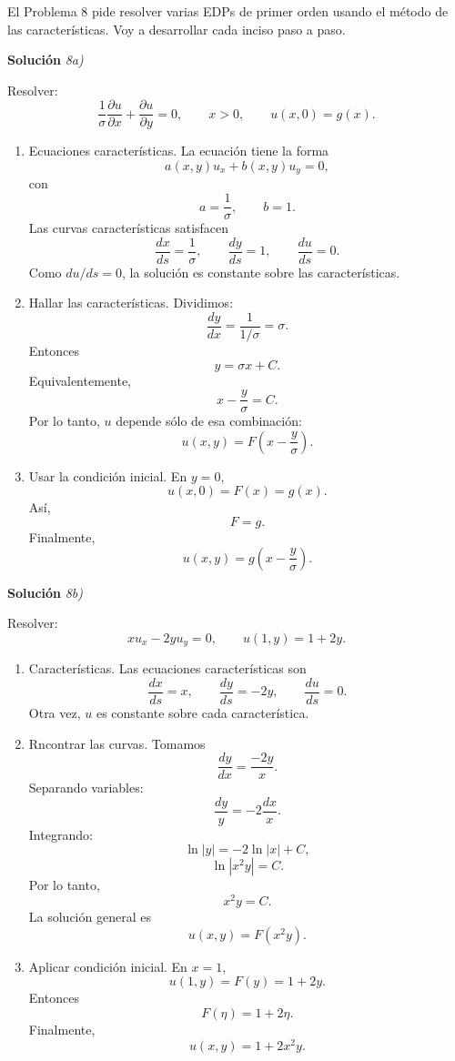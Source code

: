 \documentclass[11pt,spanish]{article}
\begin{document}
El Problema 8 pide resolver varias EDPs de primer orden usando el método de las características. 
Voy a desarrollar cada inciso paso a paso.

\vspace{0.5cm}
{\bf Soluci\'on }{\em 8a)}
\vspace{0.5cm}

Resolver:
$$
\frac1\sigma \frac{\partial u}{\partial x}+\frac{\partial u}{\partial y}=0,
\qquad x>0,
\qquad u(x,0)=g(x).
$$

\begin{enumerate}
\item Ecuaciones características.
La ecuación tiene la forma
$$
a(x,y)u_x+b(x,y)u_y=0,
$$
con
$$
a=\frac1\sigma,
\qquad
b=1.
$$
Las curvas características satisfacen
$$
\frac{dx}{ds}=\frac1\sigma,
\qquad
\frac{dy}{ds}=1,
\qquad
\frac{du}{ds}=0.
$$
Como $du/ds=0$, la solución es constante sobre las características.

\item Hallar las características.
Dividimos:
$$
\frac{dy}{dx}
=
\frac{1}{1/\sigma}
=
\sigma.
$$
Entonces
$$
y=\sigma x+C.
$$
Equivalentemente,
$$
x-\frac{y}{\sigma}=C.
$$
Por lo tanto, $u$ depende sólo de esa combinación:
$$
u(x,y)=F\left(x-\frac{y}{\sigma}\right).
$$

\item Usar la condición inicial.
En $y=0$,
$$
u(x,0)=F(x)=g(x).
$$
Así,
$$
F=g.
$$
Finalmente,
$$
\boxed{
u(x,y)=g\left(x-\frac{y}{\sigma}\right)
}.
$$
\end{enumerate}

\vspace{0.5cm}
{\bf Soluci\'on }{\em 8b)}
\vspace{0.5cm}

Resolver:
$$
x u_x-2y u_y=0,
\qquad
u(1,y)=1+2y.
$$

\begin{enumerate}
\item Características.
Las ecuaciones características son
$$
\frac{dx}{ds}=x,
\qquad
\frac{dy}{ds}=-2y,
\qquad
\frac{du}{ds}=0.
$$
Otra vez, $u$ es constante sobre cada característica.

\item Rncontrar las curvas.
Tomamos
$$
\frac{dy}{dx}
=
\frac{-2y}{x}.
$$
Separando variables:
$$
\frac{dy}{y}=-2\frac{dx}{x}.
$$
Integrando:
$$
\ln|y|=-2\ln|x|+C,
$$
$$
\ln|x^2y|=C.
$$
Por lo tanto,
$$
x^2y=C.
$$
La solución general es
$$
u(x,y)=F(x^2y).
$$

\item Aplicar condición inicial.
En $x=1$,
$$
u(1,y)=F(y)=1+2y.
$$
Entonces
$$
F(\eta)=1+2\eta.
$$
Finalmente,
$$
\boxed{
u(x,y)=1+2x^2y
}.
$$
\end{enumerate}
\end{document}
